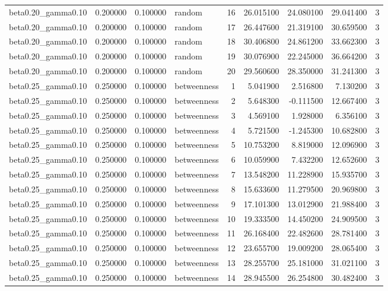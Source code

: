 \begin{tabular}{lrrlrrrrr}
beta0.20\_gamma0.10 & 0.200000 & 0.100000 & random & 16 & 26.015100 & 24.080100 & 29.041400 & 3 \\
beta0.20\_gamma0.10 & 0.200000 & 0.100000 & random & 17 & 26.447600 & 21.319100 & 30.659500 & 3 \\
beta0.20\_gamma0.10 & 0.200000 & 0.100000 & random & 18 & 30.406800 & 24.861200 & 33.662300 & 3 \\
beta0.20\_gamma0.10 & 0.200000 & 0.100000 & random & 19 & 30.076900 & 22.245000 & 36.664200 & 3 \\
beta0.20\_gamma0.10 & 0.200000 & 0.100000 & random & 20 & 29.560600 & 28.350000 & 31.241300 & 3 \\
beta0.25\_gamma0.10 & 0.250000 & 0.100000 & betweenness & 1 & 5.041900 & 2.516800 & 7.130200 & 3 \\
beta0.25\_gamma0.10 & 0.250000 & 0.100000 & betweenness & 2 & 5.648300 & -0.111500 & 12.667400 & 3 \\
beta0.25\_gamma0.10 & 0.250000 & 0.100000 & betweenness & 3 & 4.569100 & 1.928000 & 6.356100 & 3 \\
beta0.25\_gamma0.10 & 0.250000 & 0.100000 & betweenness & 4 & 5.721500 & -1.245300 & 10.682800 & 3 \\
beta0.25\_gamma0.10 & 0.250000 & 0.100000 & betweenness & 5 & 10.753200 & 8.819000 & 12.096900 & 3 \\
beta0.25\_gamma0.10 & 0.250000 & 0.100000 & betweenness & 6 & 10.059900 & 7.432200 & 12.652600 & 3 \\
beta0.25\_gamma0.10 & 0.250000 & 0.100000 & betweenness & 7 & 13.548200 & 11.228900 & 15.935700 & 3 \\
beta0.25\_gamma0.10 & 0.250000 & 0.100000 & betweenness & 8 & 15.633600 & 11.279500 & 20.969800 & 3 \\
beta0.25\_gamma0.10 & 0.250000 & 0.100000 & betweenness & 9 & 17.101300 & 13.012900 & 21.988400 & 3 \\
beta0.25\_gamma0.10 & 0.250000 & 0.100000 & betweenness & 10 & 19.333500 & 14.450200 & 24.909500 & 3 \\
beta0.25\_gamma0.10 & 0.250000 & 0.100000 & betweenness & 11 & 26.168400 & 22.482600 & 28.781400 & 3 \\
beta0.25\_gamma0.10 & 0.250000 & 0.100000 & betweenness & 12 & 23.655700 & 19.009200 & 28.065400 & 3 \\
beta0.25\_gamma0.10 & 0.250000 & 0.100000 & betweenness & 13 & 28.255700 & 25.181000 & 31.021100 & 3 \\
beta0.25\_gamma0.10 & 0.250000 & 0.100000 & betweenness & 14 & 28.945500 & 26.254800 & 30.482400 & 3 \\

\end{tabular}
